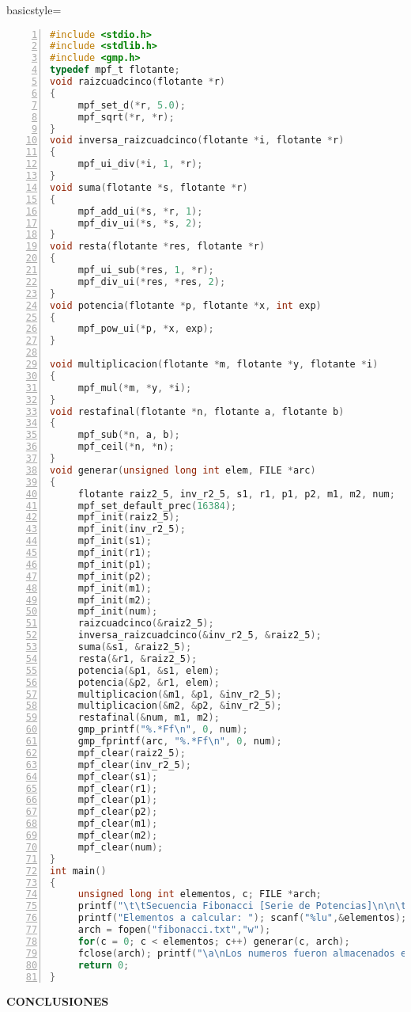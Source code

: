 \documentclass[letterpaper]{article}
\begin{document}
\lstset
{
basicstyle=\scriptsize
}
\begin{lstlisting}[language=C, numbers=left, showstringspaces=false, tabsize=3]
#include <stdio.h>
#include <stdlib.h>
#include <gmp.h>
typedef mpf_t flotante;
void raizcuadcinco(flotante *r)
{
     mpf_set_d(*r, 5.0);
     mpf_sqrt(*r, *r);
}
void inversa_raizcuadcinco(flotante *i, flotante *r)
{
     mpf_ui_div(*i, 1, *r);
}
void suma(flotante *s, flotante *r)
{
     mpf_add_ui(*s, *r, 1);
     mpf_div_ui(*s, *s, 2);
}
void resta(flotante *res, flotante *r)
{
     mpf_ui_sub(*res, 1, *r);
     mpf_div_ui(*res, *res, 2);
}
void potencia(flotante *p, flotante *x, int exp)
{
     mpf_pow_ui(*p, *x, exp);
}

void multiplicacion(flotante *m, flotante *y, flotante *i)
{
     mpf_mul(*m, *y, *i);
}
void restafinal(flotante *n, flotante a, flotante b)
{
     mpf_sub(*n, a, b);
     mpf_ceil(*n, *n);
}
void generar(unsigned long int elem, FILE *arc)
{
     flotante raiz2_5, inv_r2_5, s1, r1, p1, p2, m1, m2, num;
     mpf_set_default_prec(16384);
     mpf_init(raiz2_5);
     mpf_init(inv_r2_5);
     mpf_init(s1);
     mpf_init(r1);
     mpf_init(p1);
     mpf_init(p2);
     mpf_init(m1);
     mpf_init(m2);
     mpf_init(num);
     raizcuadcinco(&raiz2_5);
     inversa_raizcuadcinco(&inv_r2_5, &raiz2_5);
     suma(&s1, &raiz2_5);
     resta(&r1, &raiz2_5);
     potencia(&p1, &s1, elem);
     potencia(&p2, &r1, elem);
     multiplicacion(&m1, &p1, &inv_r2_5);
     multiplicacion(&m2, &p2, &inv_r2_5);
     restafinal(&num, m1, m2);
     gmp_printf("%.*Ff\n", 0, num);
     gmp_fprintf(arc, "%.*Ff\n", 0, num);
     mpf_clear(raiz2_5);
     mpf_clear(inv_r2_5);
     mpf_clear(s1);
     mpf_clear(r1);
     mpf_clear(p1);
     mpf_clear(p2);
     mpf_clear(m1);
     mpf_clear(m2);
     mpf_clear(num);
}
int main()
{
     unsigned long int elementos, c; FILE *arch;
     printf("\t\tSecuencia Fibonacci [Serie de Potencias]\n\n\t\t\tww O. ww - 1CM4\n\n\n");
     printf("Elementos a calcular: "); scanf("%lu",&elementos); printf("\n");
     arch = fopen("fibonacci.txt","w");
     for(c = 0; c < elementos; c++) generar(c, arch);
     fclose(arch); printf("\a\nLos numeros fueron almacenados en \"fibonacci.txt\"");
     return 0;
}
\end{lstlisting}
\clearpage

\begin{center}
\textbf{\LARGE CONCLUSIONES\\}
\vspace{1.0cm}
\end{center}
\end{document}
